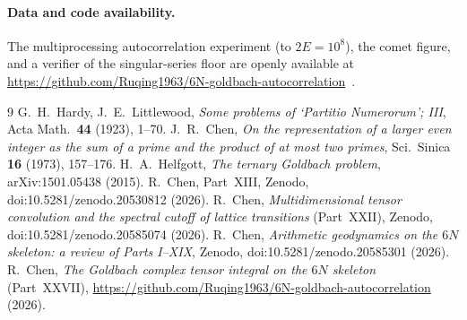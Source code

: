 \documentclass[11pt,a4paper]{article}
\theoremstyle{remark}\newtheorem{remark}{Remark}
\begin{document}
\paragraph{Data and code availability.}
The multiprocessing autocorrelation experiment (to $2E=10^8$), the comet figure, and
a verifier of the singular-series floor are openly available at
\url{https://github.com/Ruqing1963/6N-goldbach-autocorrelation}~\cite{repo}.

\begin{thebibliography}{9}
 G.~H.~Hardy, J.~E.~Littlewood, \emph{Some problems of `Partitio
Numerorum'; III}, Acta Math.\ \textbf{44} (1923), 1--70.
 J.~R.~Chen, \emph{On the representation of a larger even integer as
the sum of a prime and the product of at most two primes}, Sci.\ Sinica
\textbf{16} (1973), 157--176.
 H.~A.~Helfgott, \emph{The ternary Goldbach problem}, arXiv:1501.05438 (2015).
 R.~Chen, Part~XIII, Zenodo, doi:10.5281/zenodo.20530812 (2026).
 R.~Chen, \emph{Multidimensional tensor convolution and the
spectral cutoff of lattice transitions} (Part~XXII), Zenodo,
doi:10.5281/zenodo.20585074 (2026).
 R.~Chen, \emph{Arithmetic geodynamics on the $6N$ skeleton: a
review of Parts I--XIX}, Zenodo, doi:10.5281/zenodo.20585301 (2026).
 R.~Chen, \emph{The Goldbach complex tensor integral on the $6N$
skeleton} (Part~XXVII),
\url{https://github.com/Ruqing1963/6N-goldbach-autocorrelation} (2026).
\end{thebibliography}
\end{document}
